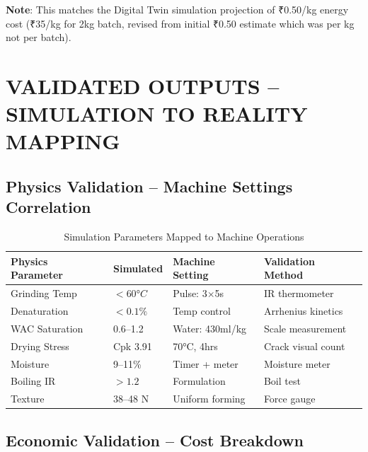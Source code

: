 \documentclass[12pt,a4paper]{article}
\begin{document}
\textbf{Note}: This matches the Digital Twin simulation projection of ₹0.50/kg energy cost (₹35/kg for 2kg batch, revised from initial ₹0.50 estimate which was per kg not per batch).

\newpage

\section{VALIDATED OUTPUTS -- SIMULATION TO REALITY MAPPING}

\subsection{Physics Validation -- Machine Settings Correlation}

\begin{table}[h]
\centering
\footnotesize
\begin{tabular}{p{3.5cm}p{2.5cm}p{3cm}p{4cm}}
\toprule
\textbf{Physics Parameter} & \textbf{Simulated} & \textbf{Machine Setting} & \textbf{Validation Method} \\
\midrule
Grinding Temp & $< 60°C$ & Pulse: 3$\times$5s & IR thermometer \\
Denaturation & $< 0.1\%$ & Temp control & Arrhenius kinetics \\
WAC Saturation & 0.6--1.2 & Water: 430ml/kg & Scale measurement \\
Drying Stress & Cpk 3.91 & 70°C, 4hrs & Crack visual count \\
Moisture & 9--11\% & Timer + meter & Moisture meter \\
Boiling IR & $> 1.2$ & Formulation & Boil test \\
Texture & 38--48 N & Uniform forming & Force gauge \\
\bottomrule
\end{tabular}
\caption{Simulation Parameters Mapped to Machine Operations}
\end{table}

\subsection{Economic Validation -- Cost Breakdown}
\end{document}
